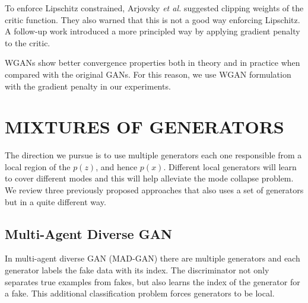 \documentclass[a4paper,onesided,12pt]{report}
\begin{document}
To enforce Lipschitz constrained, Arjovsky \textit{et al.} \cite{wgan} suggested clipping weights of the critic function. They also warned that this is not a good way enforcing Lipschitz. A follow-up work \cite{improved_wgan} introduced a more principled way by applying gradient penalty to the critic.

WGANs show better convergence properties both in theory and in practice when compared with the original GANs. For this reason, we use WGAN formulation with the gradient penalty \cite{improved_wgan} in our experiments.

\chapter{MIXTURES OF GENERATORS}
\label{chapter:me}

The direction we pursue is to use multiple generators each one responsible from a local region of the $p(z)$, and hence $p(x)$. Different local generators will learn to cover different modes and this will help alleviate the mode collapse problem. We review three previously proposed approaches that also uses a set of generators but in a quite different way.

\section{Multi-Agent Diverse GAN}
\label{sec:madgan}

In multi-agent diverse GAN (MAD-GAN) \cite{madgan} there are multiple generators and each generator labels the fake data with its index. The discriminator not only separates true examples from fakes, but also learns the index of the generator for a fake. This additional classification problem forces generators to be local.
\end{document}

